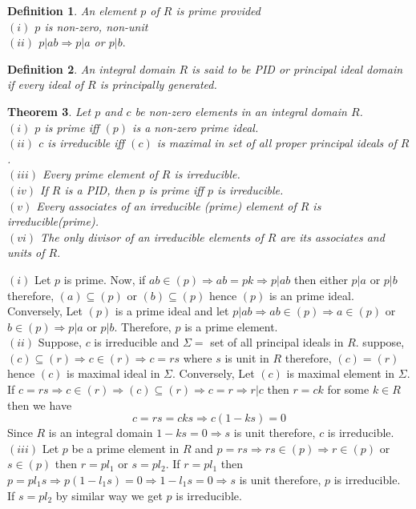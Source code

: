 \documentclass[11pt]{amsart}
\newtheorem{theorem}{Theorem}[section]
\newtheorem{definition}[theorem]{Definition}%
\begin{document}
\begin{definition}
An element $p$ of $R$ is prime provided\\
$(i)$ $p$ is non-zero, non-unit\\
$(ii)$ $p|ab \Rightarrow p|a$ or $p|b.$
\end{definition}
\begin{definition}
An integral domain $R$ is said to be PID or principal ideal domain if every ideal of $R$ is principally generated.
\end{definition}
\begin{theorem}
Let $p$ and $c$ be non-zero elements in an integral domain $R$.\\
$(i)$ $p$ is prime iff $(p)$ is a non-zero prime ideal.\\
$(ii)$ $c$ is irreducible iff $(c)$ is maximal in set of all proper principal ideals of $R$.\\
$(iii)$ Every prime element of $R$ is irreducible.\\
$(iv)$ If $R$ is a PID, then $p$ is prime iff $p$ is irreducible.\\
$(v)$ Every associates of an irreducible (prime) element of $R$ is irreducible(prime).\\
$(vi)$ The only divisor of an irreducible elements of $R$ are its associates and units of $R.$
\end{theorem}
\proof $(i)$ Let $p$ is prime. Now, if $ab\in (p) \Rightarrow ab=pk \Rightarrow p|ab$ then either $p|a$ or $p|b$ therefore, $(a)\subseteq (p)$ or $(b)\subseteq (p)$ hence $(p)$ is an prime ideal. Conversely, Let $(p)$ is a prime ideal and let $p|ab \Rightarrow ab\in (p) \Rightarrow a\in (p)$ or $b\in (p) \Rightarrow p|a$ or $p|b.$ Therefore, $p$ is a prime element.\\
$(ii)$ Suppose, $c$ is irreducible and $\Sigma=$ set of all principal ideals in $R.$ suppose, $(c)\subseteq (r) \Rightarrow c\in (r) \Rightarrow c=rs$ where $s$ is unit in $R$ therefore, $(c)=(r)$ hence $(c)$ is maximal ideal in $\Sigma.$ Conversely, Let $(c)$ is maximal element in $\Sigma.$ If $c=rs \Rightarrow c\in (r) \Rightarrow (c)\subseteq (r) \Rightarrow c=r \Rightarrow r|c$ then $r=ck$ for some $k\in R$ then we have $$c=rs=cks \Rightarrow c(1-ks)=0$$
Since $R$ is an integral domain $1-ks =0 \Rightarrow s$ is unit therefore, $c$ is irreducible.\\
$(iii)$ Let $p$ be a prime element in $R$ and $p=rs \Rightarrow rs\in (p) \Rightarrow r\in (p)$ or  $s\in (p)$ then $r=pl_1$ or $s=pl_2.$ If $r=pl_1$ then $p=pl_1s\Rightarrow p(1-l_1s)=0 \Rightarrow 1-l_1s=0 \Rightarrow s$ is unit therefore, $p$ is irreducible. If $s=pl_2$ by similar way we get $p$ is irreducible.\\
\end{document}
